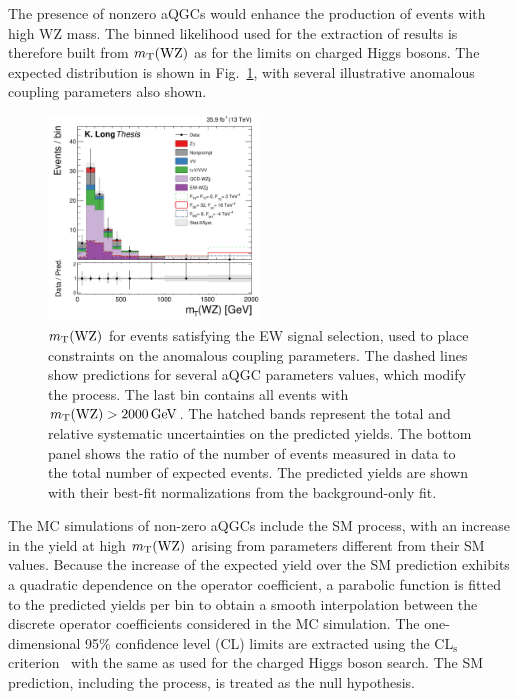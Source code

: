 The presence of nonzero aQGCs would enhance the production of events with high 
WZ mass. The binned likelihood used for the extraction of results
is therefore built from $m_{\mathrm{T}}(\mathrm{W}\mathrm{Z})$ as for the limits on charged Higgs bosons. The 
expected distribution is shown in Fig.~\ref{fig:aQGCDistributionExp}, 
with several illustrative anomalous coupling parameters also shown.

\begin{figure}[htbp]
  \centering
    \includegraphics[width=0.5\textwidth]{figures/AnalysisProcedure/MTWZ_aQGC_expected.pdf}
  \caption{
      $m_{\mathrm{T}}(\mathrm{W}\mathrm{Z})$ for events satisfying the EW signal selection,
      used to place constraints on the anomalous coupling parameters.
      The dashed lines show predictions for several aQGC parameters values, which modify the \EWWZ process.
      The last bin contains all events with $m_{\mathrm{T}}(\mathrm{W}\mathrm{Z}) > 2000\,\text{Ge\hspace{-.08em}V}$.
      The hatched bands represent the total and relative 
      systematic uncertainties on the predicted yields.
      The bottom panel shows the ratio of the number of events measured in data to the total 
      number of expected events. 
      The predicted yields are shown with their best-fit normalizations from the background-only fit.
      }
 \label{fig:aQGCDistributionExp}
\end{figure}

The MC simulations of non-zero aQGCs include the SM \EWWZ process, with an increase
in the yield at high $m_{\mathrm{T}}(\mathrm{W}\mathrm{Z})$ arising from parameters different from their SM values. 
Because the increase of the expected yield over the SM prediction exhibits a quadratic 
dependence on the operator coefficient, 
a parabolic function is fitted to the predicted yields per bin to obtain a smooth interpolation
between the discrete operator coefficients considered in the MC simulation.
The one-dimensional 95\% confidence level (CL) limits are extracted 
using the CL$\mathrm{_s}$ criterion~\cite{Junk:1999kv,CLS2,Cowan:2010js}
with the same as used for the charged Higgs boson search.
The SM prediction, including the \EWWZ process, is treated as the null hypothesis.

